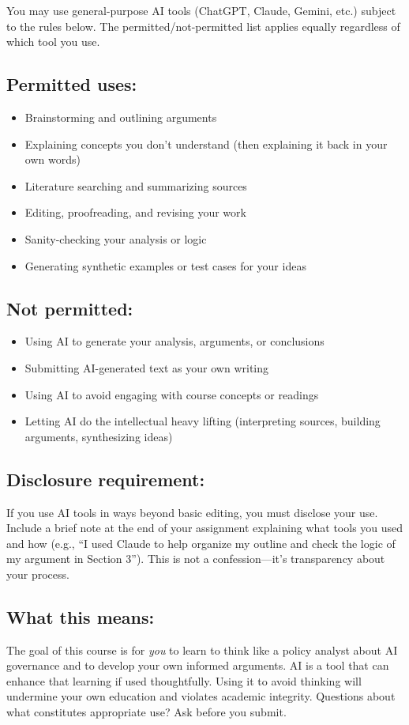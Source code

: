 \documentclass[12pt]{article}
\begin{document}
You may use general-purpose AI tools (ChatGPT, Claude, Gemini, etc.) subject to the rules below. The permitted/not-permitted list applies equally regardless of which tool you use.

\subsection*{Permitted uses:}
\begin{itemize}
\item Brainstorming and outlining arguments
\item Explaining concepts you don't understand (then explaining it back in your own words)
\item Literature searching and summarizing sources
\item Editing, proofreading, and revising your work
\item Sanity-checking your analysis or logic
\item Generating synthetic examples or test cases for your ideas
\end{itemize}

\subsection*{Not permitted:}
\begin{itemize}
\item Using AI to generate your analysis, arguments, or conclusions
\item Submitting AI-generated text as your own writing
\item Using AI to avoid engaging with course concepts or readings
\item Letting AI do the intellectual heavy lifting (interpreting sources, building arguments, synthesizing ideas)
\end{itemize}

\subsection*{Disclosure requirement:}
If you use AI tools in ways beyond basic editing, you must disclose your use. Include a brief note at the end of your assignment explaining what tools you used and how (e.g., ``I used Claude to help organize my outline and check the logic of my argument in Section 3''). This is not a confession---it's transparency about your process.

\subsection*{What this means:}
The goal of this course is for \emph{you} to learn to think like a policy analyst about AI governance and to develop your own informed arguments. AI is a tool that can enhance that learning if used thoughtfully. Using it to avoid thinking will undermine your own education and violates academic integrity. Questions about what constitutes appropriate use? Ask before you submit.
\end{document}
